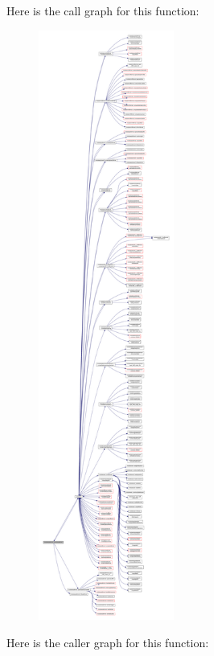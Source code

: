 Here is the call graph for this function\+:\nopagebreak
\begin{figure}[H]
\begin{center}
\leavevmode
\includegraphics[height=550pt]{namespacemodulewoaformat_a78a5f7c9fae1c493a47fc480b6f3dd86_cgraph}
\end{center}
\end{figure}
Here is the caller graph for this function\+:\nopagebreak
